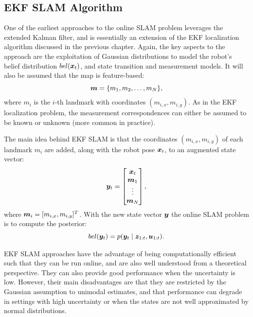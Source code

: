 \subsection{EKF SLAM Algorithm}
One of the earliest approaches to the online SLAM problem leverages the extended Kalman filter, and is essentially an extension of the EKF localization algorithm discussed in the previous chapter. Again, the key aspects to the approach are the exploitation of Gaussian distributions to model the robot's belief distribution $bel(\bm{x}_t)$, and state transition and measurement models.
It will also be assumed that the map is feature-based:
\begin{equation*}
\bm{m} = \{m_1,m_2,\dots ,m_N\},
\end{equation*}
where $m_i$ is the $i$-th landmark with coordinates $(m_{i,x}, m_{i,y})$. As in the EKF localization problem, the measurement correspondences can either be assumed to be known or unknown (more common in practice).

The main idea behind EKF SLAM is that the coordinates $(m_{i,x}, m_{i,y})$ of each landmark $m_i$ are added, along with the robot pose $\bm{x}_t$, to an augmented state vector:
\begin{equation} \label{eq:augmentedstate}
\bm{y}_t = \begin{bmatrix}
\bm{x}_t \\ \bm{m}_1 \\ \vdots \\ \bm{m}_N
\end{bmatrix},
\end{equation}
where $\bm{m}_i = [m_{i,x}, m_{i,y}]^T$. With the new state vector $\bm{y}$ the online SLAM problem is to compute the posterior:
\begin{equation*}
bel(\bm{y}_t) = p(\bm{y}_t \mid \bm{z}_{1:t}, \bm{u}_{1:t}).
\end{equation*}

EKF SLAM approaches have the advantage of being computationally efficient such that they can be run online, and are also well understood from a theoretical perspective. They can also provide good performance when the uncertainty is low. However, their main disadvantages are that they are restricted by the Gaussian assumption to unimodal estimates, and that performance can degrade in settings with high uncertainty or when the states are not well approximated by normal distributions.


